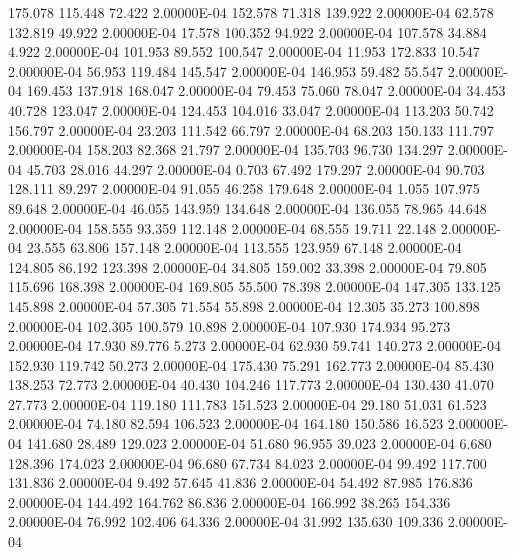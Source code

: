    175.078   115.448    72.422  2.00000E-04
   152.578    71.318   139.922  2.00000E-04
    62.578   132.819    49.922  2.00000E-04
    17.578   100.352    94.922  2.00000E-04
   107.578    34.884     4.922  2.00000E-04
   101.953    89.552   100.547  2.00000E-04
    11.953   172.833    10.547  2.00000E-04
    56.953   119.484   145.547  2.00000E-04
   146.953    59.482    55.547  2.00000E-04
   169.453   137.918   168.047  2.00000E-04
    79.453    75.060    78.047  2.00000E-04
    34.453    40.728   123.047  2.00000E-04
   124.453   104.016    33.047  2.00000E-04
   113.203    50.742   156.797  2.00000E-04
    23.203   111.542    66.797  2.00000E-04
    68.203   150.133   111.797  2.00000E-04
   158.203    82.368    21.797  2.00000E-04
   135.703    96.730   134.297  2.00000E-04
    45.703    28.016    44.297  2.00000E-04
     0.703    67.492   179.297  2.00000E-04
    90.703   128.111    89.297  2.00000E-04
    91.055    46.258   179.648  2.00000E-04
     1.055   107.975    89.648  2.00000E-04
    46.055   143.959   134.648  2.00000E-04
   136.055    78.965    44.648  2.00000E-04
   158.555    93.359   112.148  2.00000E-04
    68.555    19.711    22.148  2.00000E-04
    23.555    63.806   157.148  2.00000E-04
   113.555   123.959    67.148  2.00000E-04
   124.805    86.192   123.398  2.00000E-04
    34.805   159.002    33.398  2.00000E-04
    79.805   115.696   168.398  2.00000E-04
   169.805    55.500    78.398  2.00000E-04
   147.305   133.125   145.898  2.00000E-04
    57.305    71.554    55.898  2.00000E-04
    12.305    35.273   100.898  2.00000E-04
   102.305   100.579    10.898  2.00000E-04
   107.930   174.934    95.273  2.00000E-04
    17.930    89.776     5.273  2.00000E-04
    62.930    59.741   140.273  2.00000E-04
   152.930   119.742    50.273  2.00000E-04
   175.430    75.291   162.773  2.00000E-04
    85.430   138.253    72.773  2.00000E-04
    40.430   104.246   117.773  2.00000E-04
   130.430    41.070    27.773  2.00000E-04
   119.180   111.783   151.523  2.00000E-04
    29.180    51.031    61.523  2.00000E-04
    74.180    82.594   106.523  2.00000E-04
   164.180   150.586    16.523  2.00000E-04
   141.680    28.489   129.023  2.00000E-04
    51.680    96.955    39.023  2.00000E-04
     6.680   128.396   174.023  2.00000E-04
    96.680    67.734    84.023  2.00000E-04
    99.492   117.700   131.836  2.00000E-04
     9.492    57.645    41.836  2.00000E-04
    54.492    87.985   176.836  2.00000E-04
   144.492   164.762    86.836  2.00000E-04
   166.992    38.265   154.336  2.00000E-04
    76.992   102.406    64.336  2.00000E-04
    31.992   135.630   109.336  2.00000E-04
